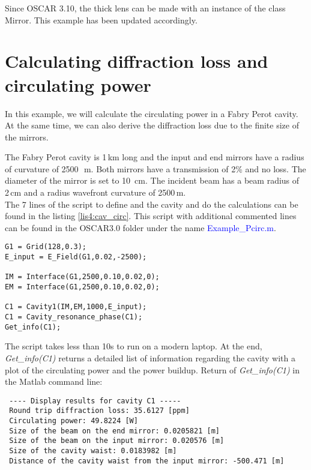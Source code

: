 Since OSCAR 3.10, the thick lens can be made with an instance of the class Mirror. This example has been updated accordingly.

\section{Calculating diffraction loss and circulating power}

In this example, we will calculate the circulating power in a Fabry Perot cavity. At the same time, we can also derive the diffraction loss due to the finite size of the mirrors.

The Fabry Perot cavity is 1\,km long and the input and end mirrors have a radius of curvature of 2500~\,m. Both mirrors have a transmission of 2\% and no loss. The diameter of the mirror is set to 10~cm. The incident beam has a beam radius of 2\,cm and a radius wavefront curvature of 2500\,m.\\

The 7 lines of the script to define and the cavity and do the calculations can be found in the listing \ref{lis4:cav_circ}. This script with additional commented lines can be found in the OSCAR3.0 folder under the name \textcolor{blue}{Example\_Pcirc.m}.

\begin{lstlisting}[float=htp,caption=Example of OSCAR script to calculate the circulating power\label{lis4:cav_circ},frame=lines]
G1 = Grid(128,0.3);
E_input = E_Field(G1,0.02,-2500);

IM = Interface(G1,2500,0.10,0.02,0);
EM = Interface(G1,2500,0.10,0.02,0);

C1 = Cavity1(IM,EM,1000,E_input);
C1 = Cavity_resonance_phase(C1);
Get_info(C1);
\end{lstlisting}

The script takes less than 10s to run on a modern laptop. At the end, \emph{Get\_info(C1)} returns a detailed list of information regarding the cavity with a plot of the circulating power and the power buildup. Return of \emph{Get\_info(C1)} in the Matlab command line:

\newpage

\begin{verbatim}
 ---- Display results for cavity C1 -----
 Round trip diffraction loss: 35.6127 [ppm]
 Circulating power: 49.8224 [W]
 Size of the beam on the end mirror: 0.0205821 [m]
 Size of the beam on the input mirror: 0.020576 [m]
 Size of the cavity waist: 0.0183982 [m]
 Distance of the cavity waist from the input mirror: -500.471 [m]
\end{verbatim}


